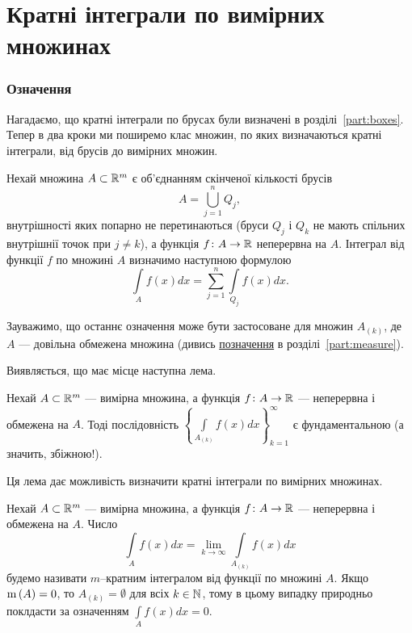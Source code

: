\part{Кратні інтеграли по вимірних множинах}
\section{Означення}
Нагадаємо, що кратні інтеграли по брусах були визначені в розділі~\ref{part:boxes}. Тепер в два кроки ми поширемо клас множин, по яких визначаються кратні інтеграли, від брусів до вимірних множин.
\begin{definition}
Нехай множина ${A\subset\mathbb{R}^{m}}$ є об'єднанням скінченої кількості брусів
\[
A = \bigcup\limits_{j=1}^nQ_j,
\]
внутрішності яких попарно не перетинаються  (бруси ${Q_j}$ і ${Q_k }$ не мають спільних внутрішнії точок при ${j\neq k}$), а функція ${f\colon A\to \mathbb{R}}$ неперервна на $A$. Інтеграл від функції $f$ по множині $A$ визначимо наступною формулою
\[
\int\limits_Af(x) d x = \sum\limits_{j=1}^n\int\limits_{Q_j}f(x) d x.
\]
\end{definition}
\begin{remark}
Зауважимо, що останнє означення може бути застосоване для множин ${A_{(k)}}$, де $A$ --- довільна обмежена множина (дивись \hyperref[partition_sets]{позначення} в розділі~\ref{part:measure}).
\end{remark}
Виявляється, що має місце наступна лема.
\begin{lemma}
Нехай ${A\subset\mathbb{R}^{m}}$ --- вимірна множина, а функція ${f\colon A\to\mathbb{R}}$ --- неперервна і обмежена на ${A}$. Тоді послідовність ${\left\{\int\limits_{A_{(k)}}f(x) d x\right\}_{k=1}^\infty}$ є фундаментальною (а значить, збіжною!).
\end{lemma}
Ця лема дає можливість визначити кратні інтеграли по вимірних множинах.
\begin{definition}
Нехай ${A\subset\mathbb{R}^{m}}$ --- вимірна множина, а функція ${f\colon A\to\mathbb{R}}$ --- неперервна і обмежена на ${A}$. Число
\[
\int\limits_{A}f(x) d x = \lim\limits_{k\to\infty}\int\limits_{A_{(k)}}f(x) d x
\]
будемо називати ${m}$--кратним інтегралом від функції  по множині ${A}$. Якщо ${\mathrm{m}\left(A\right) = 0}$, то ${A_{(k)} = \emptyset}$ для всіх ${k\in\mathbb{N}}$, тому в цьому випадку природньо поклдасти за означенням ${\int\limits_{A}f(x) d x = 0}$.
\end{definition}


